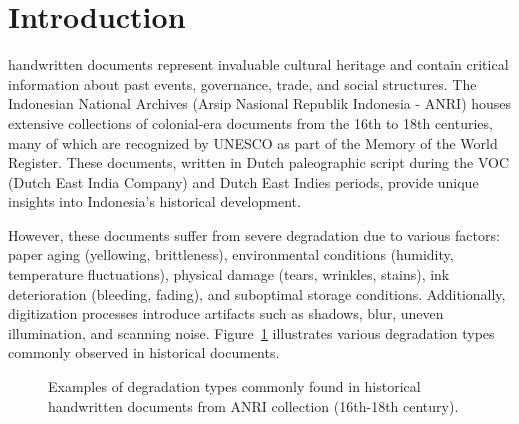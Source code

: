 \documentclass[journal]{IEEEtran}
\begin{document}
%
\IEEEpeerreviewmaketitle

\section{Introduction}
 handwritten documents represent invaluable cultural heritage and contain critical information about past events, governance, trade, and social structures. The Indonesian National Archives (Arsip Nasional Republik Indonesia - ANRI) houses extensive collections of colonial-era documents from the 16th to 18th centuries, many of which are recognized by UNESCO as part of the Memory of the World Register. These documents, written in Dutch paleographic script during the VOC (Dutch East India Company) and Dutch East Indies periods, provide unique insights into Indonesia's historical development.

However, these documents suffer from severe degradation due to various factors: paper aging (yellowing, brittleness), environmental conditions (humidity, temperature fluctuations), physical damage (tears, wrinkles, stains), ink deterioration (bleeding, fading), and suboptimal storage conditions. Additionally, digitization processes introduce artifacts such as shadows, blur, uneven illumination, and scanning noise. Figure~\ref{fig:degradation_examples} illustrates various degradation types commonly observed in historical documents.


\begin{figure}[!t]
\centering
\caption{Examples of degradation types commonly found in historical handwritten documents from ANRI collection (16th-18th century).}
\label{fig:degradation_examples}
\end{figure}
\end{document}
